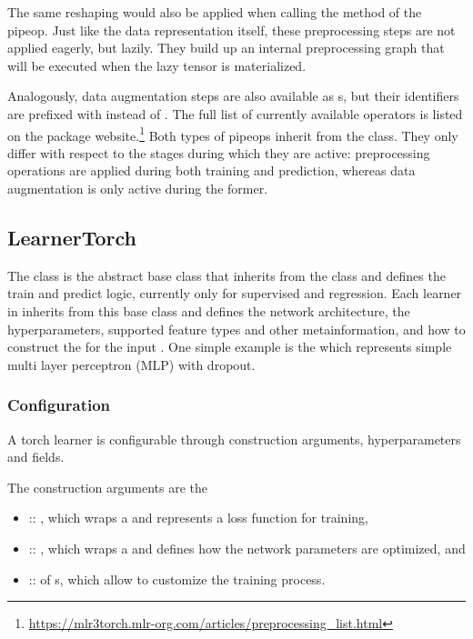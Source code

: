 \documentclass[article]{jss}
\theoremstyle{definition}
\begin{document}
The same reshaping would also be applied when calling the  method of the pipeop.
Just like the data representation itself, these preprocessing steps are not applied eagerly, but lazily.
They build up an internal preprocessing graph that will be executed when the lazy tensor is materialized.

Analogously, data augmentation steps are also available as s, but their identifiers are prefixed with  instead of .
The full list of currently available operators is listed on the package website.\footnote{\url{https://mlr3torch.mlr-org.com/articles/preprocessing\_list.html}}
Both types of pipeops inherit from the  class.
They only differ with respect to the stages during which they are active: preprocessing operations are applied during both training and prediction, whereas data augmentation is only active during the former.


\subsection{LearnerTorch}

The   class is the abstract base class that inherits from the  class and defines the train and predict logic, currently only for supervised and regression.
Each learner in  inherits from this base class and defines the network architecture, the hyperparameters, supported feature types and other metainformation, and how to construct the  for the input .
One simple example is the  which represents simple multi layer perceptron (MLP) with dropout.

\subsubsection{Configuration}

A torch learner is configurable through construction arguments, hyperparameters and fields.

The construction arguments are the
\begin{itemize}
    \item {} :: , which wraps a  and represents a loss function for training,
    \item {} :: , which wraps a  and defines how the network parameters are optimized, and
    \item {} ::  of s, which allow to customize the training process.
\end{itemize}
\end{document}
